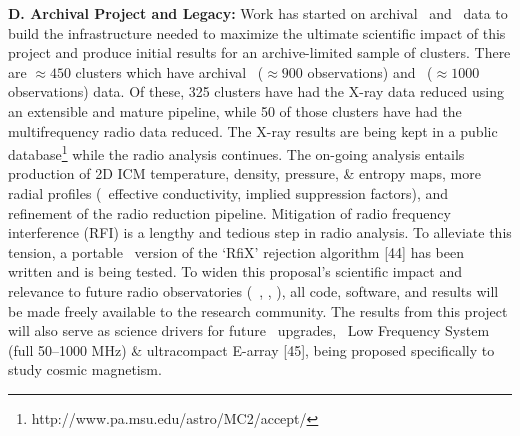\documentclass[letterpaper,11pt]{article}
\newcommand{\myhead}{Cavagnolo, Grainger Proposal}
\begin{document}
{\bf{D. Archival Project and Legacy:}} Work has started on archival
\chandra\ and \vla\ data to build the infrastructure needed to
maximize the ultimate scientific impact of this project and produce
initial results for an archive-limited sample of clusters. There are
$\approx 450$ clusters which have archival \chandra\ ($\approx 900$
observations) and \vla\ ($\approx 1000$ observations) data. Of these,
325 clusters have had the X-ray data reduced using an extensible and
mature pipeline, while 50 of those clusters have had the
multifrequency radio data reduced. The X-ray results are being kept in
a public database\footnote{http://www.pa.msu.edu/astro/MC2/accept/}
while the radio analysis continues. The on-going analysis entails
production of 2D ICM temperature, density, pressure, \& entropy maps,
more radial profiles (\eg\ effective conductivity, implied suppression
factors), and refinement of the radio reduction pipeline. Mitigation
of radio frequency interference (RFI) is a lengthy and tedious step in
radio analysis. To alleviate this tension, a portable \python\ version
of the `RfiX' rejection algorithm [44] has been written and is being
tested. To widen this proposal's scientific impact and relevance to
future radio observatories (\eg\ \lofar, \lwa, \ska), all code,
software, and results will be made freely available to the research
community. The results from this project will also serve as science
drivers for future \evla\ upgrades, \ie\ Low Frequency System (full
50--1000 MHz) \& ultracompact E-array [45], being proposed
specifically to study cosmic magnetism.


\markright{\myhead}




\end{document}
